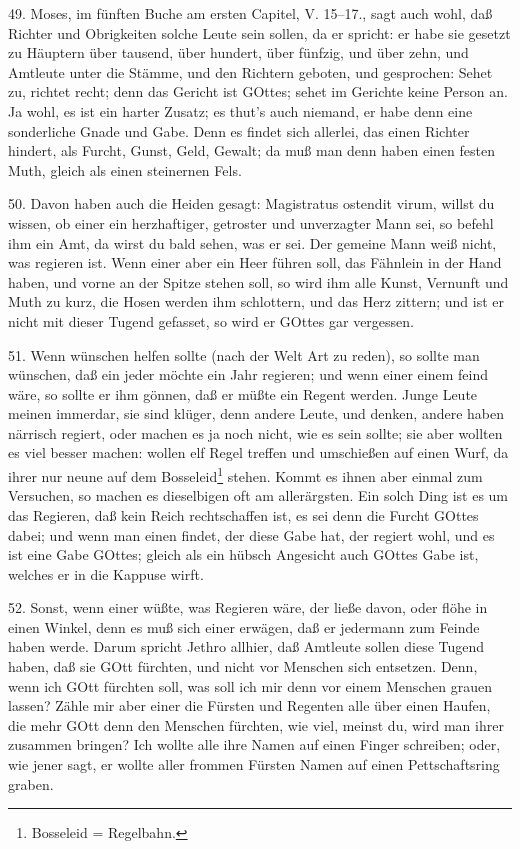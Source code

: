 49. Moses, im fünften Buche am ersten Capitel, V. 15–17., sagt auch wohl, daß Richter und Obrigkeiten solche Leute sein sollen, da er spricht: er habe sie gesetzt zu Häuptern über tausend, über hundert, über fünfzig, und über zehn, und Amtleute unter die Stämme, und den Richtern geboten, und gesprochen: Sehet zu, richtet recht; denn das Gericht ist GOttes; sehet im Gerichte keine Person an. Ja wohl, es ist ein harter Zusatz; es thut's auch niemand, er habe denn eine sonderliche Gnade und Gabe. Denn es findet sich allerlei, das einen Richter hindert, als Furcht, Gunst, Geld, Gewalt; da muß man denn haben einen festen Muth, gleich als einen steinernen Fels.

50. Davon haben auch die Heiden gesagt: Magistratus ostendit virum, willst du wissen, ob einer ein herzhaftiger, getroster und unverzagter Mann sei, so befehl ihm ein Amt, da wirst du bald sehen, was er sei. Der gemeine Mann weiß nicht, was regieren ist. Wenn einer aber ein Heer führen soll, das Fähnlein in der Hand haben, und vorne an der Spitze stehen soll, so wird ihm alle Kunst, Vernunft und Muth zu kurz, die Hosen werden ihm schlottern, und das Herz zittern; und ist er nicht mit dieser Tugend gefasset, so wird er GOttes gar vergessen.

51. Wenn wünschen helfen sollte (nach der Welt Art zu reden), so sollte man wünschen, daß ein jeder möchte ein Jahr regieren; und wenn einer einem feind wäre, so sollte er ihm gönnen, daß er müßte ein Regent werden. Junge Leute meinen immerdar, sie sind klüger, denn andere Leute, und denken, andere haben närrisch regiert, oder machen es ja noch nicht, wie es sein sollte; sie aber wollten es viel besser machen: wollen elf Regel treffen und umschießen auf einen Wurf, da ihrer nur neune auf dem Bosseleid\footnote{Bosseleid = Regelbahn.} stehen. Kommt es ihnen aber einmal zum Versuchen, so machen es dieselbigen oft am allerärgsten. Ein solch Ding ist es um das Regieren, daß kein Reich rechtschaffen ist, es sei denn die Furcht GOttes dabei; und wenn man einen findet, der diese Gabe hat, der regiert wohl, und es ist eine Gabe GOttes; gleich als ein hübsch Angesicht auch GOttes Gabe ist, welches er in die Kappuse wirft.

52. Sonst, wenn einer wüßte, was Regieren wäre, der ließe davon, oder flöhe in einen Winkel, denn es muß sich einer erwägen, daß er jedermann zum Feinde haben werde. Darum spricht
Jethro allhier, daß Amtleute sollen diese Tugend haben, daß sie GOtt fürchten, und nicht vor Menschen sich entsetzen. Denn, wenn ich GOtt fürchten soll, was soll ich mir denn vor einem Menschen grauen lassen? Zähle mir aber einer die Fürsten und Regenten alle über einen Haufen, die mehr GOtt denn den Menschen fürchten, wie viel, meinst du, wird man ihrer zusammen bringen? Ich wollte alle ihre Namen auf einen Finger schreiben; oder, wie jener sagt, er wollte aller frommen Fürsten Namen auf einen Pettschaftsring graben.

